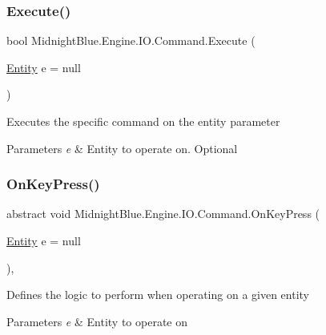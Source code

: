\subsubsection{\texorpdfstring{Execute()}{Execute()}}
{\footnotesize\ttfamily bool Midnight\+Blue.\+Engine.\+I\+O.\+Command.\+Execute (\begin{DoxyParamCaption}\item[{\hyperlink{class_midnight_blue_1_1_engine_1_1_entity_component_1_1_entity}{Entity}}]{e = {\ttfamily null} }\end{DoxyParamCaption})\hspace{0.3cm}{\ttfamily [inline]}}



Executes the specific command on the entity parameter 


\begin{DoxyParams}{Parameters}
{\em e} & Entity to operate on. Optional\\
\hline
\end{DoxyParams}
\hypertarget{class_midnight_blue_1_1_engine_1_1_i_o_1_1_command_ae641d2c1a9db17f03ee6b7854b00a9d2}{}\label{class_midnight_blue_1_1_engine_1_1_i_o_1_1_command_ae641d2c1a9db17f03ee6b7854b00a9d2} 
\subsubsection{\texorpdfstring{On\+Key\+Press()}{OnKeyPress()}}
{\footnotesize\ttfamily abstract void Midnight\+Blue.\+Engine.\+I\+O.\+Command.\+On\+Key\+Press (\begin{DoxyParamCaption}\item[{\hyperlink{class_midnight_blue_1_1_engine_1_1_entity_component_1_1_entity}{Entity}}]{e = {\ttfamily null} }\end{DoxyParamCaption})\hspace{0.3cm}{\ttfamily [protected]}, {}}



Defines the logic to perform when operating on a given entity 


\begin{DoxyParams}{Parameters}
{\em e} & Entity to operate on\\
\hline
\end{DoxyParams}



